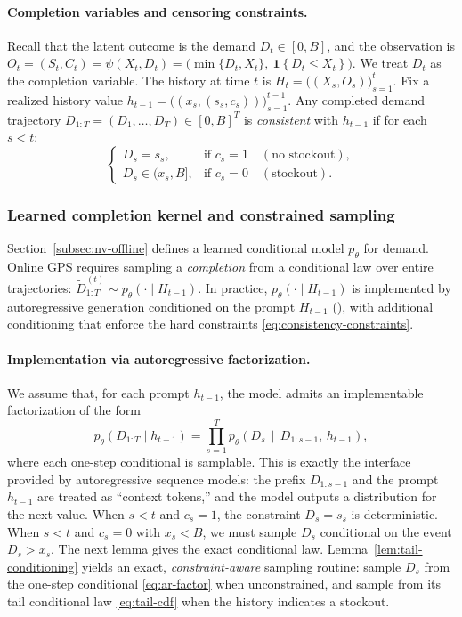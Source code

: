 \documentclass[11pt]{article}
\DeclarePairedDelimiter{\ind}{\mathbf{1}\{}{\}}
\providecommand{\ind}[1]{\mathbf{1}\!\left\{#1\right\}}
\begin{document}
\paragraph{Completion variables and censoring constraints.} Recall that the latent outcome is the demand $D_t\in[0,B]$, and the observation is $O_t=(S_t,C_t)=\psi(X_t,D_t)=\bigl(\min\{D_t,X_t\},\ \ind{D_t\le X_t}\bigr)$. We treat $D_t$ as the completion variable. The history at time $t$ is \( H_t=\bigl((X_s,O_s)\bigr)_{s=1}^t\). Fix a realized history value $h_{t-1}=\bigl((x_s,(s_s,c_s))\bigr)_{s=1}^{t-1}$.
Any completed demand trajectory $D_{1:T}=(D_1,\dots,D_T)\in[0,B]^T$ is
\emph{consistent} with $h_{t-1}$ if for each $s<t$:
\begin{equation}
\label{eq:consistency-constraints}
\begin{cases}
D_s = s_s, & \text{if } c_s=1 \quad (\text{no stockout}),\\
D_s \in (x_s,B], & \text{if } c_s=0 \quad (\text{stockout}).
\end{cases}
\end{equation}



\subsubsection{Learned completion kernel and constrained sampling}

Section~\ref{subsec:nv-offline} defines a learned conditional model $p_\theta$ for  demand.
Online GPS requires sampling a \emph{completion} from a conditional law over entire trajectories:
\(\widetilde{D}_{1:T}^{(t)} \sim p_\theta(\cdot\mid H_{t-1})\). In practice, $p_\theta(\cdot\mid H_{t-1})$ is implemented by autoregressive generation conditioned on the prompt
$H_{t-1}$ (\citealp{cai2024active,zhang2025contextual}), with additional conditioning that enforce the hard
constraints \eqref{eq:consistency-constraints}.

\paragraph{Implementation via autoregressive factorization.}
We assume that, for each prompt $h_{t-1}$, the model admits an implementable factorization of the form
\begin{equation}
\label{eq:ar-factor}
p_\theta(D_{1:T}\mid h_{t-1})
=
\prod_{s=1}^T p_\theta\!\left(D_s \,\middle|\, D_{1:s-1},\, h_{t-1}\right),
\end{equation}
where each one-step conditional is samplable. This is exactly the interface provided by autoregressive sequence models: the prefix $D_{1:s-1}$ and the prompt $h_{t-1}$ are treated as ``context tokens,'' and the model outputs a distribution for the next value. When $s<t$ and $c_s=1$, the constraint $D_s=s_s$ is deterministic. When $s<t$ and $c_s=0$ with $x_s<B$, we
must sample $D_s$ conditional on the event $D_s>x_s$. The next lemma gives the exact conditional law. Lemma~\ref{lem:tail-conditioning} yields an exact, \emph{constraint-aware} sampling routine: sample $D_s$ from the one-step conditional \eqref{eq:ar-factor} when unconstrained, and sample from its tail conditional law \eqref{eq:tail-cdf} when the history indicates a stockout.
\end{document}
